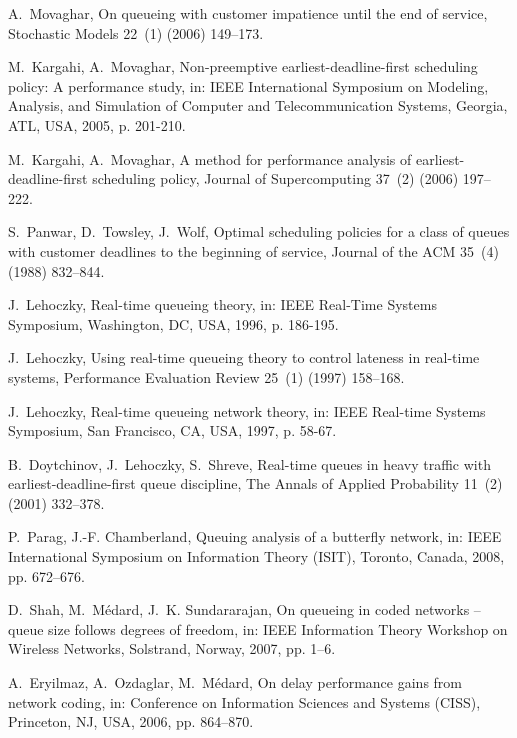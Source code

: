 \documentclass[preprint,12pt]{elsarticle}
\theoremstyle{definition}
\theoremstyle{plain}
\theoremstyle{remark}
\begin{document}
\begin{thebibliography}{100}
A.~Movaghar, On queueing with customer impatience until the end of service,
  Stochastic Models 22~(1) (2006) 149--173.

M.~Kargahi, A.~Movaghar, Non-preemptive earliest-deadline-first scheduling
  policy: A performance study, in: IEEE International Symposium on Modeling,
  Analysis, and Simulation of Computer and Telecommunication Systems, Georgia,
  ATL, USA, 2005, p. 201-210.

M.~Kargahi, A.~Movaghar, A method for performance analysis of
  earliest-deadline-first scheduling policy, Journal of Supercomputing 37~(2)
  (2006) 197--222.

S.~Panwar, D.~Towsley, J.~Wolf, Optimal scheduling policies for a class of
  queues with customer deadlines to the beginning of service, Journal of the
  ACM 35~(4) (1988) 832--844.

J.~Lehoczky, Real-time queueing theory, in: IEEE Real-Time Systems Symposium,
  Washington, DC, USA, 1996, p. 186-195.

J.~Lehoczky, Using real-time queueing theory to control lateness in real-time
  systems, Performance Evaluation Review 25~(1) (1997) 158--168.

J.~Lehoczky, Real-time queueing network theory, in: IEEE Real-time Systems
  Symposium, San Francisco, CA, USA, 1997, p. 58-67.

B.~Doytchinov, J.~Lehoczky, S.~Shreve, Real-time queues in heavy traffic with
  earliest-deadline-first queue discipline, The Annals of Applied Probability
  11~(2) (2001) 332--378.

P.~Parag, J.-F. Chamberland, Queuing analysis of a butterfly network, in: IEEE
  International Symposium on Information Theory (ISIT), Toronto, Canada, 2008,
  pp. 672--676.

D.~Shah, M.~M\'{e}dard, J.~K. Sundararajan, On queueing in coded networks --
  queue size follows degrees of freedom, in: IEEE Information Theory Workshop
  on Wireless Networks, Solstrand, Norway, 2007, pp. 1--6.

A.~Eryilmaz, A.~Ozdaglar, M.~M\'{e}dard, On delay performance gains from
  network coding, in: Conference on Information Sciences and Systems (CISS),
  Princeton, NJ, USA, 2006, pp. 864--870.


\end{thebibliography}
\end{document}
